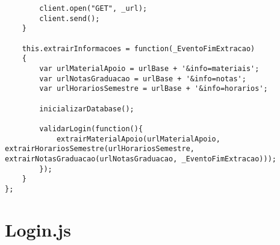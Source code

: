 \begin{lstlisting}
		client.open("GET", _url);
 		client.send();  
 	}
 	
 	this.extrairInformacoes = function(_EventoFimExtracao)
 	{
 		var urlMaterialApoio = urlBase + '&info=materiais';
 		var urlNotasGraduacao = urlBase + '&info=notas';
 		var urlHorariosSemestre = urlBase + '&info=horarios';
 		
 		inicializarDatabase();

 		validarLogin(function(){
 			extrairMaterialApoio(urlMaterialApoio, extrairHorariosSemestre(urlHorariosSemestre, extrairNotasGraduacao(urlNotasGraduacao, _EventoFimExtracao)));
 		});
 	}
};
\end{lstlisting}

\section{Login.js}
